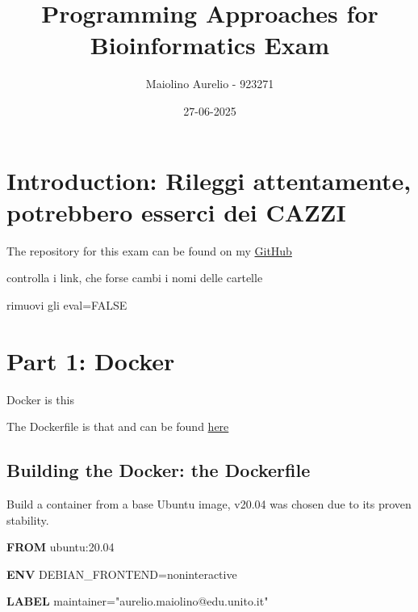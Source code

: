 \documentclass[]{article}
\title{Programming Approaches for Bioinformatics Exam}
\author{Maiolino Aurelio - 923271}
\date{27-06-2025}
\newenvironment{Shaded}{\begin{snugshade}}{\end{snugshade}}
\newcommand{\KeywordTok}[1]{\textcolor[rgb]{0.13,0.29,0.53}{\textbf{#1}}}
\newcommand{\NormalTok}[1]{#1}
\newcommand{\StringTok}[1]{\textcolor[rgb]{0.31,0.60,0.02}{#1}}
\begin{document}
\maketitle

{
\setcounter{tocdepth}{2}
\tableofcontents
}
\thispagestyle{empty}

\newpage
{}
\setcounter{page}{1}

\hypertarget{introduction-rileggi-attentamente-potrebbero-esserci-dei-cazzi}{%
\section{Introduction: Rileggi attentamente, potrebbero esserci dei
CAZZI}\label{introduction-rileggi-attentamente-potrebbero-esserci-dei-cazzi}}

The repository for this exam can be found on my
\href{https://github.com/Maiolino-Au/ProgrAppBioinfo_Exam}{GitHub}

controlla i link, che forse cambi i nomi delle cartelle

rimuovi gli eval=FALSE

\newpage

\hypertarget{part-1-docker}{%
\section{Part 1: Docker}\label{part-1-docker}}

Docker is this

The Dockerfile is that and can be found
\href{https://github.com/Maiolino-Au/ProgrAppBioinfo_Exam/blob/main/Docker_container}{here}

\hypertarget{building-the-docker-the-dockerfile}{%
\subsection{Building the Docker: the
Dockerfile}\label{building-the-docker-the-dockerfile}}

Build a container from a base Ubuntu image, v20.04 was chosen due to its
proven stability.

\begin{Shaded}
\begin{Highlighting}[]
\KeywordTok{FROM}\NormalTok{ ubuntu:20.04}

\KeywordTok{ENV}\NormalTok{ DEBIAN_FRONTEND=noninteractive}

\KeywordTok{LABEL}\NormalTok{ maintainer=}\StringTok{"aurelio.maiolino@edu.unito.it"}
\end{Highlighting}
\end{Shaded}
\end{document}
